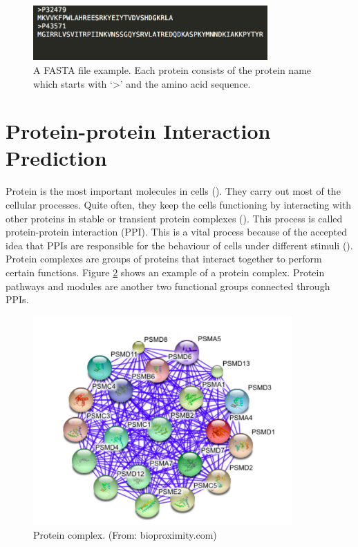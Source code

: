 \begin{figure}
\begin{center}
\includegraphics[width=0.8\textwidth]{img/fasta.png}
\caption[A FASTA file example]{A FASTA file example. Each protein consists of the protein name which starts with `\textgreater' and the amino acid sequence.}
\label{fig:fasta}  
\end{center}
\end{figure}

\section{Protein-protein Interaction Prediction \label{PPI_site_intro}}
Protein is the most important molecules in cells (\cite{schleif1993genetics}). 
They carry out most of the cellular processes. Quite often, they keep the cells functioning by interacting with other proteins in stable or transient protein complexes (\cite{eisenberg2000protein}).
This process is called protein-protein interaction (PPI). This is a vital process because of the accepted idea that PPIs are responsible for the behaviour of cells under different stimuli (\cite{bader2003functional, pandey2000proteomics, schwikowski2000network}).
Protein complexes are groups of proteins that interact together to perform certain functions. Figure \ref{fig_pro_comp} shows an example of a protein complex. Protein pathways and modules are another two functional groups connected through PPIs. 
\begin{figure}[h!]
\begin{center}
\includegraphics[height = 8cm]{img/pro_comp.png}
\caption[Protein complex]{Protein complex. (From: bioproximity.com)  \label{fig_pro_comp}}
\end{center}
\end{figure}
